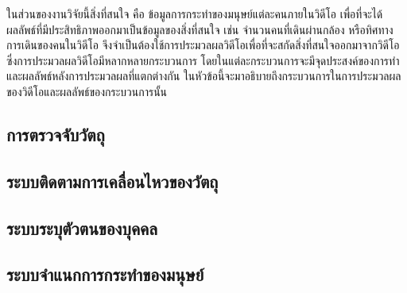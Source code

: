 ในส่วนของงานวิจัยนี้สิ่งที่สนใจ คือ ข้อมูลการกระทำของมนุษย์แต่ละคนภายในวิดีโอ เพื่อที่จะได้ผลลัพธ์ที่มีประสิทธิภาพออกมาเป็นข้อมูลของสิ่งที่สนใจ เช่น จำนวนคนที่เดินผ่านกล้อง 
หรือทิศทางการเดินของคนในวิดีโอ จึงจำเป็นต้องใช้การประมวลผลวิดีโอเพื่อที่จะสกัดสิ่งที่สนใจออกมาจากวิดีโอ ซึ่งการประมวลผลวิดีโอมีหลากหลายกระบวนการ 
โดยในแต่ละกระบวนการจะมีจุดประสงค์ของการทำและผลลัพธ์หลังการประมวลผลที่แตกต่างกัน ในหัวข้อนี้จะมาอธิบายถึงกระบวนการในการประมวลผลของวิดีโอและผลลัพธ์ของกระบวนการนั้น
\subsection{การตรวจจับวัตถุ}


\subsection{ระบบติดตามการเคลื่อนไหวของวัตถุ}


\subsection{ระบบระบุตัวตนของบุคคล}

\clearpage
\subsection{ระบบจำแนกการกระทำของมนุษย์}
